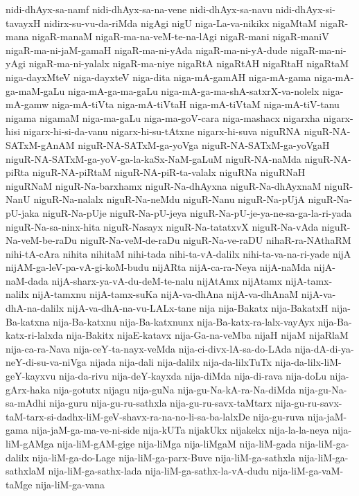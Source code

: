 {nidi-dhAyx-sa-namf
nidi-dhAyx-sa-na-vene
nidi-dhAyx-sa-navu
nidi-dhAyx-si-tavayxH
nidirx-su-vu-da-riMda
nigAgi
nigU
niga-La-va-nikikx
nigaMtaM
nigaR-mana
nigaR-manaM
nigaR-ma-na-veM-te-na-lAgi
nigaR-mani
nigaR-maniV
nigaR-ma-ni-jaM-gamaH
nigaR-ma-ni-yAda
nigaR-ma-ni-yA-dude
nigaR-ma-ni-yAgi
nigaR-ma-ni-yalalx
nigaR-ma-niye
nigaRtA
nigaRtAH
nigaRtaH
nigaRtaM
niga-dayxMteV
niga-dayxteV
niga-dita
niga-mA-gamAH
niga-mA-gama
niga-mA-ga-maM-gaLu
niga-mA-ga-ma-gaLu
niga-mA-ga-ma-shA-satxrX-va-nolelx
niga-mA-gamw
niga-mA-tiVta
niga-mA-tiVtaH
niga-mA-tiVtaM
niga-mA-tiV-tanu
nigama
nigamaM
niga-ma-gaLu
niga-ma-goV-cara
niga-mashacx
nigarxha
nigarx-hisi
nigarx-hi-si-da-vanu
nigarx-hi-su-tAtxne
nigarx-hi-suva
niguRNA
niguR-NA-SATxM-gAnAM
niguR-NA-SATxM-ga-yoVga
niguR-NA-SATxM-ga-yoVgaH
niguR-NA-SATxM-ga-yoV-ga-la-kaSx-NaM-gaLuM
niguR-NA-naMda
niguR-NA-piRta
niguR-NA-piRtaM
niguR-NA-piR-ta-valalx
niguRNa
niguRNaH
niguRNaM
niguR-Na-barxhamx
niguR-Na-dhAyxna
niguR-Na-dhAyxnaM
niguR-NanU
niguR-Na-nalalx
niguR-Na-neMdu
niguR-Nanu
niguR-Na-pUjA
niguR-Na-pU-jaka
niguR-Na-pUje
niguR-Na-pU-jeya
niguR-Na-pU-je-ya-ne-sa-ga-la-ri-yada
niguR-Na-sa-ninx-hita
niguR-Nasayx
niguR-Na-tatatxvX
niguR-Na-vAda
niguR-Na-veM-be-raDu
niguR-Na-veM-de-raDu
niguR-Na-ve-raDU
nihaR-ra-NAthaRM
nihi-tA-cAra
nihita
nihitaM
nihi-tada
nihi-ta-vA-dalilx
nihi-ta-va-na-ri-yade
nijA
nijAM-ga-leV-pa-vA-gi-koM-budu
nijARta
nijA-ca-ra-Neya
nijA-naMda
nijA-naM-dada
nijA-sharx-ya-vA-du-deM-te-nalu
nijAtAmx
nijAtamx
nijA-tamx-nalilx
nijA-tamxnu
nijA-tamx-suKa
nijA-va-dhAna
nijA-va-dhAnaM
nijA-va-dhA-na-dalilx
nijA-va-dhA-na-vu-LALx-tane
nija
nija-Bakatx
nija-BakatxH
nija-Ba-katxna
nija-Ba-katxnu
nija-Ba-katxnunx
nija-Ba-katx-ra-lalx-vayAyx
nija-Ba-katx-ri-lalxda
nija-Bakitx
nijaE-katavx
nija-Ga-na-veMba
nijaH
nijaM
nijaRlaM
nija-ca-ra-Nava
nija-ceY-ta-nayx-veMda
nija-ci-divx-lA-sa-do-LAda
nija-dA-di-ya-neY-di-su-va-niVga
nijada
nija-dali
nija-dalilx
nija-da-lilxTuTx
nija-da-lilx-liM-geY-kayxvu
nija-da-rivu
nija-deY-kayxda
nija-diMda
nija-di-rava
nija-doLu
nija-gArx-haka
nija-gotutx
nijagu
nija-guNa
nija-gu-Na-kA-ra-Na-diMda
nija-gu-Na-sa-mAdhi
nija-guru
nija-gu-ru-sathxla
nija-gu-ru-savx-taMtarx
nija-gu-ru-savx-taM-tarx-si-dadhx-liM-geV-shavx-ra-na-no-li-sa-ba-lalxDe
nija-gu-ruva
nija-jaM-gama
nija-jaM-ga-ma-ve-ni-side
nija-kUTa
nijakUkx
nijakekx
nija-la-la-neya
nija-liM-gAMga
nija-liM-gAM-gige
nija-liMga
nija-liMgaM
nija-liM-gada
nija-liM-ga-dalilx
nija-liM-ga-do-Lage
nija-liM-ga-parx-Buve
nija-liM-ga-sathxla
nija-liM-ga-sathxlaM
nija-liM-ga-sathx-lada
nija-liM-ga-sathx-la-vA-dudu
nija-liM-ga-vaM-taMge
nija-liM-ga-vana
}
